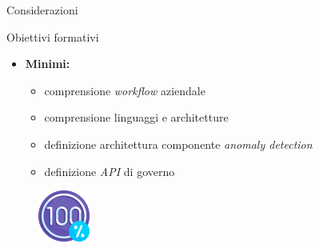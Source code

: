 \documentclass{beamer}
\begin{document}
	\begin{frame}{Considerazioni}
		\begin{block}{Obiettivi formativi}
			\begin{itemize}
				\item \textbf{Minimi:}
					\begin{itemize}
						\item comprensione \textit{workflow} aziendale \vspace{.5em}
						\item comprensione linguaggi e architetture \vspace{.5em}
						\item definizione architettura componente \textit{anomaly detection} \vspace{.5em}
						\item definizione \textit{API} di governo \vspace{.5em}
					\end{itemize}
			\end{itemize}
		\end{block}
		
		\begin{figure}[!h]
    		 \centering
    		\includegraphics[width=1.7cm]{../immagini/slide/100-percent.png}
		\end{figure}
	\end{frame}
	
\end{document}
